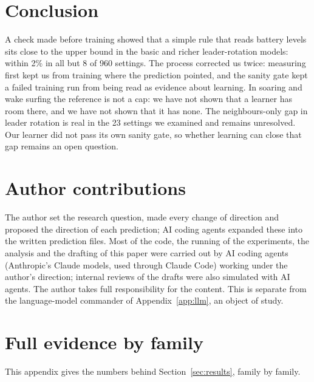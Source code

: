\documentclass[11pt]{article}
\begin{document}
\section{Conclusion}

A check made before training showed that a simple rule that reads battery levels sits close to the upper bound in the basic and richer leader-rotation models: within 2\% in all but 8 of 960 settings.
The process corrected us twice: measuring first kept us from training where the prediction pointed, and the sanity gate kept a failed training run from being read as evidence about learning.
In soaring and wake surfing the reference is not a cap: we have not shown that a learner has room there, and we have not shown that it has none.
The neighbours-only gap in leader rotation is real in the 23 settings we examined and remains unresolved.
Our learner did not pass its own sanity gate, so whether learning can close that gap remains an open question.

\section*{Author contributions}
The author set the research question, made every change of direction and proposed the direction of each prediction; AI coding agents expanded these into the written prediction files. Most of the code, the running of the experiments, the analysis and the drafting of this paper were carried out by AI coding agents (Anthropic's Claude models, used through Claude Code) working under the author's direction; internal reviews of the drafts were also simulated with AI agents. The author takes full responsibility for the content. This is separate from the language-model commander of Appendix~\ref{app:llm}, an object of study.




\clearpage
\appendix

\section{Full evidence by family}
\label{app:evidence}

This appendix gives the numbers behind Section~\ref{sec:results}, family by family.
\end{document}
